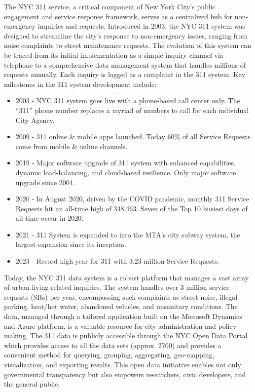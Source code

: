 \documentclass[12pt, titlepage]{article}
\begin{document}
The NYC 311 service, a critical component of New York City's public
engagement and service response framework, serves as a centralized hub
for non-emergency inquiries and requests. Introduced in 2003, the NYC
311 system was designed to streamline the city's response to
non-emergency issues, ranging from noise complaints to street
maintenance requests. The evolution of this system can be traced from
its initial implementation as a simple inquiry channel via telephone to a
comprehensive data management system that handles millions of requests
annually. Each inquiry is logged as a complaint in the 311 system.
Key milestones in the 311 system development include:

\begin{itemize}
 	\item 2003 - NYC 311 system goes live with a phone-based call center only. The ``311'' phone number replaces a myriad of numbers to call for each individual City Agency.
   	\item 2009 - 311 online \& mobile apps launched. Today 60\% of all Service Requests come from mobile \& online channels.
   	\item 2019 - Major software upgrade of 311 system with enhanced capabilities, dynamic load-balancing, and cloud-based resilience. Only major software upgrade since 2004.	
      \item 2020 - In August 2020, driven by the COVID pandemic, monthly 311 Service Requests hit an all-time high of 348,463. Seven of the Top 10 busiest days of all-time occur in 2020.
      \item 2021 - 311 System is expanded to into the MTA's city subway system, the largest expansion since its inception.
   	\item 2023 - Record high year for 311 with 3.23 million Service Requests.
\end{itemize}

Today, the NYC 311 data system is a robust platform that manages a
vast array of urban living-related inquiries. The system handles over 3 million service 
requests (SRs) per year, encompassing such complaints as street noise, illegal parking, heat/hot water, abandoned vehicles,
and unsanitary conditions. The data, managed through a tailored application built on the 
Microsoft Dynamics and Azure platform, is a valuable resource for city
administration and policy-making. The 311 data is publicly accessible through the 
NYC Open Data Portal which provides access
to all the data sets (approx. 2700) and provides a convenient method for querying, grouping, aggregating, geo-mapping, visualization, and exporting
results. This open data initiative enables not only governmental transparency but also empowers 
researchers, civic developers, and the general public. 
\end{document}
